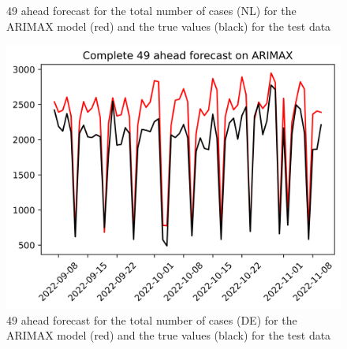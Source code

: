 \begin{figure}
\begin{minipage}{.32\textwidth}
  \caption{49 ahead forecast for the total number of cases (NL) for the ARIMAX model (red) and the true values (black) for the test data}
  \label{fig:tot_cases_fc_49_ARIMAX}
\end{minipage}
\begin{minipage}{.32\textwidth}
  \centering
  \includegraphics[width=\linewidth]{pics/49_ah/DE_Complete_49_ahead_ARIMAX.png}
  \caption{49 ahead forecast for the total number of cases (DE) for the ARIMAX model (red) and the true values (black) for the test data}
  \label{fig:tot_cases_fc_49_ARIMAX_DE}
\end{minipage}

\end{figure}
